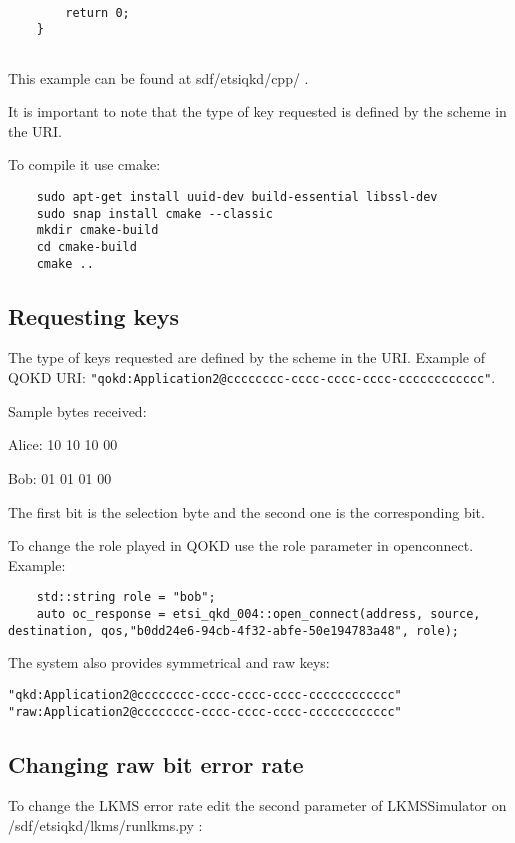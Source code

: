 \begin{refsection}
\begin{verbatim}
		
		return 0;
	}
	
\end{verbatim}

This example can be found at sdf/etsi\textunderscore qkd/cpp/ .

It is important to note that the type of key requested is defined by the scheme in the URI.

To compile it use cmake:

\begin{verbatim}
	sudo apt-get install uuid-dev build-essential libssl-dev
	sudo snap install cmake --classic
	mkdir cmake-build
	cd cmake-build
	cmake ..
\end{verbatim}

\subsection{Requesting keys}

The type of keys requested are defined by the scheme in the URI. Example of QOKD URI: \texttt{"qokd:Application2@cccccccc-cccc-cccc-cccc-cccccccccccc"}.

Sample bytes received:

Alice: 10 10 10 00


Bob: 01 01 01 00

The first bit is the selection byte and the second one is the corresponding bit. 

To change the role played in QOKD use the role parameter in open\textunderscore connect. Example:

\begin{verbatim}
	std::string role = "bob";
	auto oc_response = etsi_qkd_004::open_connect(address, source, destination, qos,"b0dd24e6-94cb-4f32-abfe-50e194783a48", role);
\end{verbatim}


The system also provides symmetrical and raw keys:

\texttt{"qkd:Application2@cccccccc-cccc-cccc-cccc-cccccccccccc"}
\texttt{"raw:Application2@cccccccc-cccc-cccc-cccc-cccccccccccc"}


\subsection{Changing raw bit error rate}

To change the LKMS error rate edit the second parameter of LKMSSimulator on /sdf/etsi\textunderscore qkd/lkms/run\textunderscore lkms.py :


\end{refsection}
